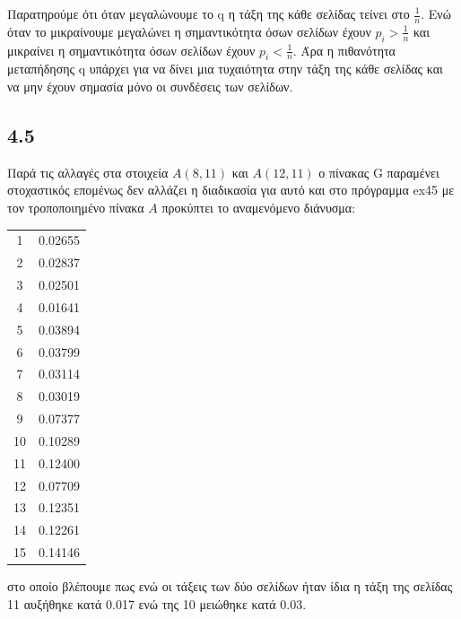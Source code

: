 \documentclass[a4paper,11pt]{article}
\begin{document}
\begin{flushleft}
Παρατηρούμε ότι όταν μεγαλώνουμε το q η τάξη της κάθε σελίδας τείνει στο $\frac{1}{n}$. Ενώ όταν το μικραίνουμε μεγαλώνει η σημαντικότητα όσων σελίδων έχουν $p_i>\frac{1}{n}$ και μικραίνει η σημαντικότητα όσων σελίδων έχουν $p_i<\frac{1}{n}$. Άρα η πιθανότητα μεταπήδησης q υπάρχει για να δίνει μια τυχαιότητα στην τάξη της κάθε σελίδας και να μην έχουν σημασία μόνο οι συνδέσεις των σελίδων.

\subsection*{4.5}
Παρά τις αλλαγές στα στοιχεία $A(8,11)$ και $A(12,11)$ ο πίνακας G παραμένει στοχαστικός επομένως δεν αλλάζει η διαδικασία για αυτό και στο πρόγραμμα ex45 με τον τροποποιημένο πίνακα $A$ προκύπτει το αναμενόμενο διάνυσμα:
\begin{center}
    \begin{tabular}{|c|c|}
        \hline
        1 & 0.02655 \\
        2 & 0.02837 \\
        3 & 0.02501 \\
        4 & 0.01641 \\
        5 & 0.03894 \\
        6 & 0.03799 \\
        7 & 0.03114 \\
        8 & 0.03019 \\
        9 & 0.07377 \\ \hline
        10 & 0.10289 \\
        11 & 0.12400 \\ \hline
        12 & 0.07709 \\
        13 & 0.12351 \\
        14 & 0.12261 \\
        15 & 0.14146 \\
        \hline
    \end{tabular}
\end{center}

στο οποίο βλέπουμε πως ενώ οι τάξεις των δύο σελίδων ήταν ίδια η τάξη της σελίδας 11 αυξήθηκε κατά 0.017 ενώ της 10 μειώθηκε κατά 0.03.


\end{flushleft}
\end{document}
